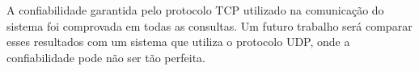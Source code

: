 \documentclass[12pt,a4paper]{article}
\begin{document}
A confiabilidade garantida pelo protocolo TCP utilizado na comunicação do sistema foi comprovada em todas as consultas. Um futuro trabalho será comparar esses resultados com um sistema que utiliza o protocolo UDP, onde a confiabilidade pode não ser tão perfeita.


\singlespace


\end{document}
